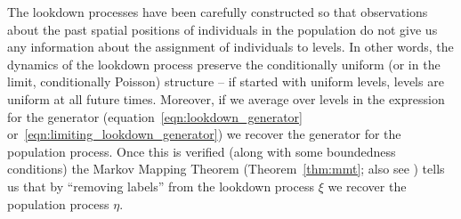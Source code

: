 \documentclass[12pt]{article}
\newcommand{\lp}{\xi}              %
\numberwithin{equation}{section}
\begin{document}
The lookdown processes have been carefully constructed so that
observations about the past spatial positions of individuals in 
the population do not give us any information about the assignment of 
individuals to levels.
In other words, the dynamics of the lookdown
process preserve the conditionally uniform (or in the limit, conditionally Poisson) structure
-- if started with uniform levels,
levels are uniform at all future times.
Moreover, if we average over levels in the expression for the generator
(equation~\eqref{eqn:lookdown_generator} or~\eqref{eqn:limiting_lookdown_generator})
we recover the generator for the population process.
Once this is verified (along with some boundedness conditions)
the Markov Mapping Theorem (Theorem~\ref{thm:mmt}; also see \citet{etheridge/kurtz:2019})
tells us that by ``removing labels'' from the lookdown process $\lp$
we recover the population process $\eta$.
\end{document}
